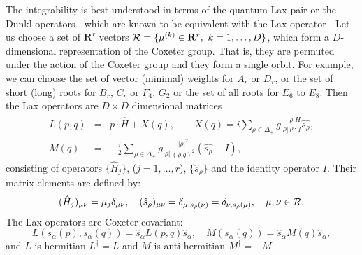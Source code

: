 \documentclass[a4paper,12pt]{article}
\begin{document}
The integrability is best understood in terms of the quantum Lax pair
\cite{bms} or
the Dunkl operators \cite{Dunk,Heck}, which are known to be equivalent
with the Lax operator \cite{kps}.
Let us choose a set of \(\mathbf{R}^{r}\)
vectors
\({\cal R}=\{\mu^{(k)}\in\mathbf{R}^{r},\ k=1,\ldots, D\}\),
which form a \(D\)-dimensional representation of the Coxeter group.
That is, they are permuted
under the action of the Coxeter group and they form a single orbit.
For example, we can choose the
set of vector (minimal) weights for $A_{r}$ or $D_{r}$, or the set of
short (long) roots for $B_{r}$, $C_{r}$ or $F_{4}$, $G_{2}$ or the set
of all roots for $E_{6}$ to $E_{8}$.
Then the
Lax operators are \(D\times D\) dimensional matrices
\begin{eqnarray}
   \label{LaxOpDef}
   L(p,q) &=& p\cdot\hat{H}+X(q),\qquad X(q)
   =i\sum_{\rho\in\Delta_+}g_{|\rho|}
\frac{\rho.\hat{H}}{\rho\cdot q}\hat{s_\rho},
   \\ \nonumber
   M(q) &=&
   -\frac{i}{2}\sum_{\rho\in\Delta_+}g_{|\rho|}
   \frac{|\rho|^{2}}{(\rho.q)^2}(\hat{s_\rho}-I),
\end{eqnarray}
consisting of operators \(\{\hat{H}_j\}\),
(\(j=1,\ldots,r\)), \(\{\hat{s}_{\rho}\}\) and
the identity operator $I$.
Their matrix elements are defined by:
\begin{equation}
    (\hat{H}_{j})_{\mu\nu}=\mu_j\delta_{\mu\nu},\quad
    (\hat{s}_{\rho})_{\mu\nu}=\delta_{\mu,s_\rho(\nu)}=
      \delta_{\nu,s_\rho(\mu)},\quad \mu,\nu\in{\cal R}.
\end{equation}
The Lax operators are Coxeter covariant:
\begin{equation}
L(s_{\alpha}(p),s_{\alpha}(q))=\hat{s}_\alpha L(p,q)\hat{s}_\alpha,\quad
M(s_{\alpha}(q))=\hat{s}_\alpha M(q)\hat{s}_\alpha,
\label{lmcoxcov}
\end{equation}
and $L$ is hermitian $L^\dagger=L$ and $M$
is anti-hermitian $M^\dagger=-M$.
\end{document}
